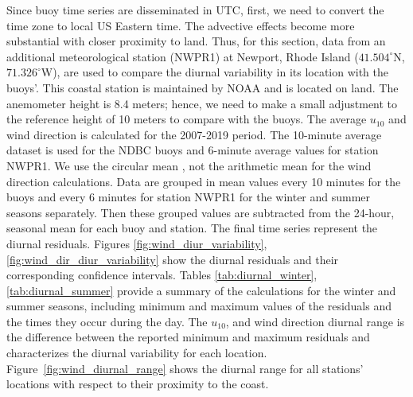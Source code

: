 Since buoy time series are disseminated in UTC, first, we need to convert the time zone to local US Eastern time. The advective effects become more substantial with closer proximity to land. Thus, for this section, data from an additional meteorological station (NWPR1) at Newport, Rhode Island ($41.504^{\circ}$N, $71.326^{\circ}$W), are used to compare the diurnal variability in its location with the buoys'. This coastal station is maintained by NOAA and is located on land. The anemometer height is 8.4 meters; hence, we need to make a small adjustment to the reference height of 10 meters to compare with the buoys. The average $u_{10}$ and wind direction is calculated for the 2007-2019 period. The 10-minute average dataset is used for the NDBC buoys and 6-minute average values for station NWPR1. We use the circular mean \cite{Soukissian2014}, not the arithmetic mean for the wind direction calculations. Data are grouped in mean values every 10 minutes for the buoys and every 6 minutes for station NWPR1 for the winter and summer seasons separately. Then these grouped values are subtracted from the 24-hour, seasonal mean for each buoy and station. The final time series represent the diurnal residuals. Figures \ref{fig:wind_diur_variability}, \ref{fig:wind_dir_diur_variability} show the diurnal residuals and their corresponding confidence intervals. Tables \ref{tab:diurnal_winter}, \ref{tab:diurnal_summer} provide a summary of the calculations for the winter and summer seasons, including minimum and maximum values of the residuals and the times they occur during the day. The $u_{10}$, and wind direction diurnal range is the difference between the reported minimum and maximum residuals and characterizes the diurnal variability for each location. Figure~\ref{fig:wind_diurnal_range} shows the diurnal range for all stations' locations with respect to their proximity to the coast.



